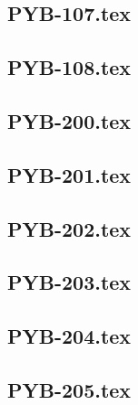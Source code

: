 \renewcommand{\xxexo}{PYB-107.tex} 
\subsection*{\xxexo} 
\graphicspath{{../../exos/python_bases/PYB-107/}}
 
 
\renewcommand{\xxexo}{PYB-108.tex} 
\subsection*{\xxexo} 
\graphicspath{{../../exos/python_bases/PYB-108/}}
 
 
\renewcommand{\xxexo}{PYB-200.tex} 
\subsection*{\xxexo} 
\graphicspath{{../../exos/python_bases/PYB-200/}}
 
 
\renewcommand{\xxexo}{PYB-201.tex} 
\subsection*{\xxexo} 
\graphicspath{{../../exos/python_bases/PYB-201/}}
 
 
\renewcommand{\xxexo}{PYB-202.tex} 
\subsection*{\xxexo} 
\graphicspath{{../../exos/python_bases/PYB-202/}}
 
 
\renewcommand{\xxexo}{PYB-203.tex} 
\subsection*{\xxexo} 
\graphicspath{{../../exos/python_bases/PYB-203/}}
 
 
\renewcommand{\xxexo}{PYB-204.tex} 
\subsection*{\xxexo} 
\graphicspath{{../../exos/python_bases/PYB-204/}}
 
 
\renewcommand{\xxexo}{PYB-205.tex} 
\subsection*{\xxexo} 
\graphicspath{{../../exos/python_bases/PYB-205/}}
 
 
